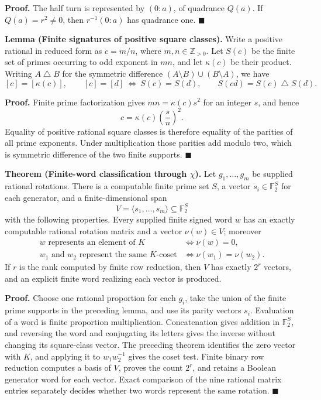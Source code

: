 \documentclass[11pt]{article}
\begin{document}
\smallskip
\noindent\textbf{Proof.}
The half turn is represented by \((0:a)\), of quadrance \(Q(a)\).  If
\(Q(a)=r^2\ne0\), then \(r^{-1}(0:a)\) has quadrance one.
\hfill\(\blacksquare\)

\medskip
\noindent\textbf{Lemma (Finite signatures of positive square classes).}
Write a positive rational in reduced form as \(c=m/n\), where
\(m,n\in\mathbb Z_{>0}\).  Let \(S(c)\) be the finite set of primes occurring
to odd exponent in \(mn\), and let
\(\kappa(c)\) be their product.  Writing \(A\mathbin\triangle B\) for the
symmetric difference \((A\setminus B)\cup(B\setminus A)\), we have
\[
 [c]=[\kappa(c)],\qquad
 [c]=[d]\ \Longleftrightarrow\ S(c)=S(d),\qquad
 S(cd)=S(c)\mathbin\triangle S(d).
\]

\smallskip
\noindent\textbf{Proof.}
Finite prime factorization gives \(mn=\kappa(c)s^2\) for an integer \(s\),
and hence
\[
 c=\kappa(c)\left(\frac{s}{n}\right)^2.
\]
Equality of positive rational square classes is therefore equality of the
parities of all prime exponents.  Under multiplication those parities add
modulo two, which is symmetric difference of the two finite supports.
\hfill\(\blacksquare\)

\medskip
\noindent\textbf{Theorem (Finite-word classification through \(\chi\)).}
Let \(g_1,\ldots,g_m\) be supplied rational rotations.  There is a computable
finite prime set \(S\), a vector \(s_i\in\mathbb F_2^S\) for each generator,
and a finite-dimensional span
\[
 V=\langle s_1,\ldots,s_m\rangle\subseteq\mathbb F_2^S
\]
with the following properties.  Every supplied finite signed word \(w\) has
an exactly computable rational rotation matrix and a vector
\(\nu(w)\in V\); moreover
\[
\begin{aligned}
 w\text{ represents an element of }K
   &\Longleftrightarrow \nu(w)=0,\\
 w_1\text{ and }w_2\text{ represent the same }K\text{-coset}
   &\Longleftrightarrow \nu(w_1)=\nu(w_2).
\end{aligned}
\]
If \(r\) is the rank computed by finite row reduction, then \(V\) has exactly
\(2^r\) vectors, and an explicit finite word realizing each vector is
produced.

\smallskip
\noindent\textbf{Proof.}
Choose one rational proportion for each \(g_i\), take the union of the finite
prime supports in the preceding lemma, and use its parity vectors \(s_i\).
Evaluation of a word is finite proportion multiplication.  Concatenation
gives addition in \(\mathbb F_2^S\), and reversing the word and conjugating
its letters gives the inverse without changing its square-class vector.
The preceding theorem identifies the zero vector with \(K\), and applying it
to \(w_1w_2^{-1}\) gives the coset test.  Finite binary row reduction computes
a basis of \(V\), proves the count \(2^r\), and retains a Boolean generator
word for each vector.  Exact comparison of the nine rational matrix entries
separately decides whether two words represent the same rotation.
\hfill\(\blacksquare\)
\end{document}
